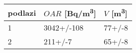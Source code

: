 \begin{tabular}{lll}
\toprule
podlazi & $OAR$ [\si{Bq/m^3}] & $V$ [\si{m^3}] \\
\midrule
1 &          3042+/-108 &         77+/-8 \\
2 &             211+/-7 &         65+/-8 \\
\bottomrule
\end{tabular}
